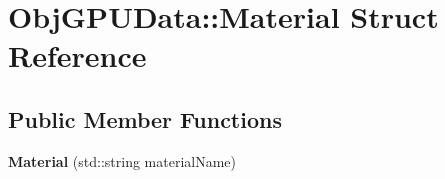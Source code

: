 \hypertarget{struct_obj_g_p_u_data_1_1_material}{}\section{Obj\+G\+P\+U\+Data\+:\+:Material Struct Reference}
\label{struct_obj_g_p_u_data_1_1_material}
\subsection*{Public Member Functions}
\begin{DoxyCompactItemize}
\item 
{\bfseries Material} (std\+::string material\+Name)\hypertarget{struct_obj_g_p_u_data_1_1_material_abebac09d7ee98edf5a7881c5ee0b0e15}{}\label{struct_obj_g_p_u_data_1_1_material_abebac09d7ee98edf5a7881c5ee0b0e15}

\end{DoxyCompactItemize}
